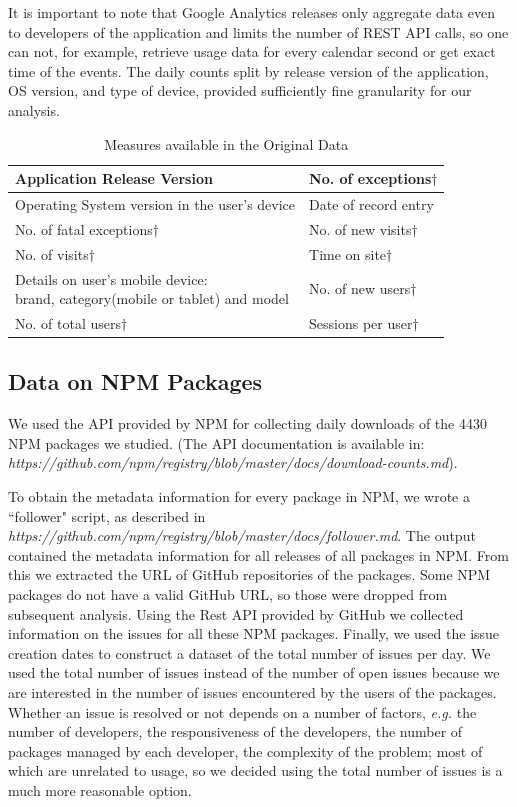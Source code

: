 \documentclass[smallextended]{svjour3}       %
\begin{document}
It is important to note that Google Analytics releases only
aggregate data even to developers of the application and limits the
number of REST API calls, so one can not, for example, retrieve
usage data for every calendar second or get exact time of the
events. The daily counts split by release version of
the application, OS version, and type of device, provided
sufficiently fine granularity for our analysis. 
\begin{table}
\caption{Measures available in the Original Data}\label{t:measures}
\begin{tabular}{|p{6.5cm}|p{4cm}|}\hline
Application Release Version & No. of exceptions$\dagger$\\\hline
Operating System version in the user's device &Date of record entry\\\hline
No. of fatal exceptions$\dagger$& No. of new visits$\dagger$\\\hline
No. of visits$\dagger$ & Time on site$\dagger$\\\hline
\pbox{6cm}{Details on user's mobile device:\\ brand, category(mobile or tablet) and model} & No. of new users$\dagger$\\\hline
No. of total users$\dagger$& Sessions per user$\dagger$\\ \hline
\end{tabular}
\vspace{-10pt}
\end{table}

\subsection{Data on NPM Packages}

We used the API provided by NPM for collecting daily downloads of the 4430 NPM packages we studied. (The API documentation is available in: \textit{https://github.com/npm/registry/blob/master/docs/download-counts.md}).

To obtain the metadata information for every package in NPM, we wrote a ``follower" script, as described in 
\\ \textit{https://github.com/npm/registry/blob/master/docs/follower.md}.
The output contained the metadata information for all releases of all packages in NPM. From this we extracted the URL of GitHub repositories of the packages. Some NPM packages do not have a valid GitHub URL, so those were dropped from subsequent analysis. Using the Rest API provided by GitHub we collected information on the issues for all these NPM packages. Finally, we used the issue creation dates to construct a dataset of the total number of issues per day. We used the total number of issues instead of the number of open issues because we are interested in the number of issues encountered by the users of the packages. Whether an issue is resolved or not depends on a number of factors, \emph{e.g.} the number of developers, the responsiveness of the developers, the number of packages managed by each developer, the complexity of the problem; most of which are unrelated to usage, so we decided using the total number of issues is a much more reasonable option.
\end{document}
